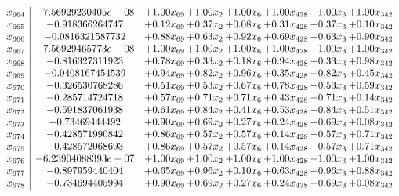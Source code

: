 \documentclass[8pt]{article}
\begin{document}
\[\begin{array}{c| c c@{\hskip 2pt} c@{\hskip 2pt} c@{\hskip 2pt} c@{\hskip 2pt} c@{\hskip 2pt} c@{\hskip 2pt} }
 x_{664}   &  -7.56929230405e-08 & +  1.00 x_{69} & +  1.00 x_{2} & +  1.00 x_{6} & +  1.00 x_{428} & +  1.00 x_{3} & +  1.00 x_{342}\\
 x_{665}   &  -0.918366264747 & +  0.12 x_{69} & +  0.37 x_{2} & +  0.08 x_{6} & +  0.31 x_{428} & +  0.37 x_{3} & +  0.10 x_{342}\\
 x_{666}   &  -0.0816321587732 & +  0.88 x_{69} & +  0.63 x_{2} & +  0.92 x_{6} & +  0.69 x_{428} & +  0.63 x_{3} & +  0.90 x_{342}\\
 x_{667}   &  -7.56929465773e-08 & +  1.00 x_{69} & +  1.00 x_{2} & +  1.00 x_{6} & +  1.00 x_{428} & +  1.00 x_{3} & +  1.00 x_{342}\\
 x_{668}   &  -0.816327311923 & +  0.78 x_{69} & +  0.33 x_{2} & +  0.18 x_{6} & +  0.94 x_{428} & +  0.33 x_{3} & +  0.98 x_{342}\\
 x_{669}   &  -0.0408167454539 & +  0.94 x_{69} & +  0.82 x_{2} & +  0.96 x_{6} & +  0.35 x_{428} & +  0.82 x_{3} & +  0.45 x_{342}\\
 x_{670}   &  -0.326530768286 & +  0.51 x_{69} & +  0.53 x_{2} & +  0.67 x_{6} & +  0.78 x_{428} & +  0.53 x_{3} & +  0.59 x_{342}\\
 x_{671}   &  -0.285714724718 & +  0.57 x_{69} & +  0.71 x_{2} & +  0.71 x_{6} & +  0.43 x_{428} & +  0.71 x_{3} & +  0.14 x_{342}\\
 x_{672}   &  -0.591837061938 & +  0.61 x_{69} & +  0.84 x_{2} & +  0.41 x_{6} & +  0.53 x_{428} & +  0.84 x_{3} & +  0.51 x_{342}\\
 x_{673}   &  -0.73469444492 & +  0.90 x_{69} & +  0.69 x_{2} & +  0.27 x_{6} & +  0.24 x_{428} & +  0.69 x_{3} & +  0.08 x_{342}\\
 x_{674}   &  -0.428571990842 & +  0.86 x_{69} & +  0.57 x_{2} & +  0.57 x_{6} & +  0.14 x_{428} & +  0.57 x_{3} & +  0.71 x_{342}\\
 x_{675}   &  -0.428572068693 & +  0.86 x_{69} & +  0.57 x_{2} & +  0.57 x_{6} & +  0.14 x_{428} & +  0.57 x_{3} & +  0.71 x_{342}\\
 x_{676}   &  -6.23904088393e-07 & +  1.00 x_{69} & +  1.00 x_{2} & +  1.00 x_{6} & +  1.00 x_{428} & +  1.00 x_{3} & +  1.00 x_{342}\\
 x_{677}   &  -0.897959440404 & +  0.65 x_{69} & +  0.96 x_{2} & +  0.10 x_{6} & +  0.63 x_{428} & +  0.96 x_{3} & +  0.88 x_{342}\\
 x_{678}   &  -0.734694405994 & +  0.90 x_{69} & +  0.69 x_{2} & +  0.27 x_{6} & +  0.24 x_{428} & +  0.69 x_{3} & +  0.08 x_{342}\\

\end{array}\]
\end{document}
